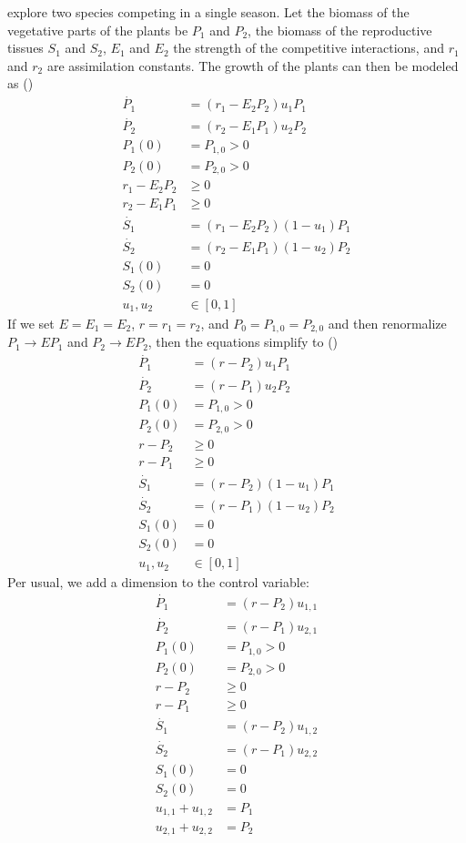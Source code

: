\documentclass{article}
\begin{document}
\citet{mirmirani_competition_1978} explore two species competing in a single season. Let the biomass of the vegetative parts of the plants be $P_1$ and $P_2$, the biomass of the reproductive tissues $S_1$ and $S_2$, $E_1$ and $E_2$ the strength of the competitive interactions, and $r_1$ and $r_2$ are assimilation constants. The growth of the plants can then be modeled as (\citep[Eq.\ 4--1 -- 4--4]{mirmirani_competition_1978})
\begin{align}
\dot{P_1} &= (r_1-E_2 P_2) u_1 P_1 \\
\dot{P_2} &= (r_2-E_1 P_1) u_2 P_2 \\
P_1(0)      &=P_{1,0}>0 \\
P_2(0)      &=P_{2,0}>0 \\
r_1-E_2 P_2 &\ge 0 \\
r_2-E_1 P_1 &\ge 0 \\
\dot{S_1} &= (r_1-E_2 P_2) (1 - u_1) P_1 \\
\dot{S_2} &= (r_2-E_1 P_1) (1 - u_2) P_2 \\
S_1(0)&=0 \\
S_2(0)&=0 \\
u_1, u_2 & \in [0,1]
\end{align}
If we set $E=E_1=E_2$, $r=r_1=r_2$, and $P_0=P_{1,0}=P_{2,0}$ and then renormalize $P_1\rightarrow EP_1$ and $P_2\rightarrow EP_2$, then the equations simplify to (\citep[Eq.\ 4--4 -- 4--8]{mirmirani_competition_1978})
\begin{align}
  \dot{P_1} &= (r-P_2) u_1 P_1 \\
  \dot{P_2} &= (r-P_1) u_2 P_2 \\
  P_1(0)      &=P_{1,0}>0 \\
  P_2(0)      &=P_{2,0}>0 \\
  r-P_2 &\ge 0 \\
  r-P_1 &\ge 0 \\
  \dot{S_1} &= (r-P_2) (1 - u_1) P_1 \\
  \dot{S_2} &= (r-P_1) (1 - u_2) P_2 \\
  S_1(0)&=0 \\
  S_2(0)&=0 \\
  u_1, u_2 & \in [0,1]
\end{align}
Per usual, we add a dimension to the control variable:
\begin{align}
  \dot{P_1} &= (r-P_2) u_{1,1} \\
  \dot{P_2} &= (r-P_1) u_{2,1} \\
  P_1(0)      &=P_{1,0}>0 \\
  P_2(0)      &=P_{2,0}>0 \\
  r-P_2 &\ge 0 \\
  r-P_1 &\ge 0 \\
  \dot{S_1} &= (r-P_2) u_{1,2} \\
  \dot{S_2} &= (r-P_1) u_{2,2} \\
  S_1(0)&=0 \\
  S_2(0)&=0 \\
  u_{1,1} + u_{1,2} &= P_1 \\
  u_{2,1} + u_{2,2} &= P_2
\end{align}
\end{document}
